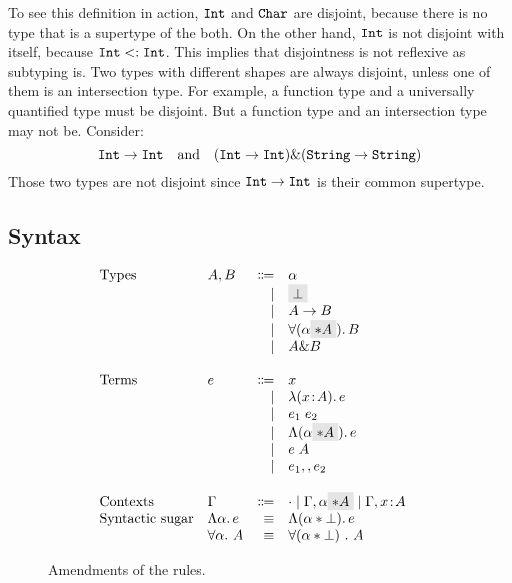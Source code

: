 To see this definition in action, $\texttt{Int}$ and $\texttt{Char}$ are disjoint,
because there is
no type that is a supertype of the both. On the other hand, $\texttt{Int}$ is not
disjoint with itself, because $\texttt{Int} <: \texttt{Int}$. This implies that
disjointness is not reflexive as subtyping is. Two types with different shapes
are always disjoint, unless one of them is an intersection type. For example, a function
type and a universally quantified type must be disjoint. But a function type and an intersection
type may not be. Consider:
\[ \texttt{Int} \to \texttt{Int} \quad \text{and} \quad (\texttt{Int} \to \texttt{Int}) \& (\texttt{String} \to \texttt{String}) \]
Those two types are not disjoint since $\texttt{Int} \to \texttt{Int}$ is their common supertype.

\subsection{Syntax}

\begin{figure}
  \[
    \begin{array}{l}
      \begin{array}{llrll}
        \text{Types}
        & A, B & \Coloneqq & \alpha                  & \\
        &      & \mid & \highlight {$\bot$}          & \\
        &      & \mid & A \to B                      & \\
        &      & \mid & \for {(\alpha \highlight {$\disjoint A$})} B  & \\
        &      & \mid & A \inter B                   & \\

        \\
        \text{Terms}
        & e & \Coloneqq & x                        & \\
        &   & \mid & \lam {(x \oftype A)} e          & \\
        &   & \mid & \app {e_1} {e_2}              & \\
        &   & \mid & \blam {(\alpha \highlight {$\disjoint A$})} e  & \\
        &   & \mid & \tapp e A                     & \\
        &   & \mid & e_1 \mergeop e_2              & \\

        \\
        \text{Contexts}
        & \Gamma & \Coloneqq & \cdot
                   \mid \Gamma, \alpha \highlight {$\disjoint A$}
                   \mid \Gamma, x \oftype A  & \\

        \text{Syntactic sugar} & \blam \alpha e & \equiv & \blamdis \alpha \bot e & \\
                               & \forall \alpha.~A & \equiv & \forall (\alpha * \bot)~.~A & \\
      \end{array}
    \end{array}
  \]

  \caption{Amendments of the rules.}
  \label{fig:fi-syntax-dis}
\end{figure}

